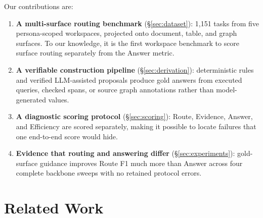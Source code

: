 \documentclass[11pt]{article}
\begin{document}
Our contributions are:
\begin{enumerate}
\item \textbf{A multi-surface routing benchmark}
(\S\ref{sec:dataset}): 1{,}151 tasks from five persona-scoped workspaces, projected
onto document, table, and graph surfaces. To our knowledge, it is the first
workspace benchmark to score surface routing separately from the Answer metric.
\item \textbf{A verifiable construction pipeline}
(\S\ref{sec:derivation}): deterministic rules and verified LLM-assisted
proposals produce gold answers from executed queries, checked spans, or source
graph annotations rather than model-generated values.
\item \textbf{A diagnostic scoring protocol} (\S\ref{sec:scoring}): Route,
Evidence, Answer, and Efficiency are scored separately, making it possible to
locate failures that one end-to-end score would hide.
\item \textbf{Evidence that routing and answering differ}
(\S\ref{sec:experiments}): gold-surface guidance improves Route F1 much more
than Answer across four complete backbone sweeps with no retained protocol errors.
\end{enumerate}

\section{Related Work}
\label{sec:related}
\end{document}
